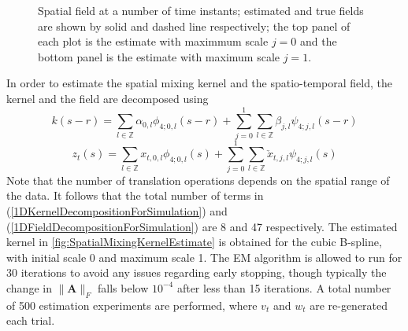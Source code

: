 \documentclass[11pt,draftcls,onecolumn,peerreview]{IEEEtran}
\begin{document}
\begin{figure}[!hb]
\caption{Spatial field at a number of time instants; estimated and true fields are shown by solid and dashed line respectively; the top panel of each plot is the estimate with maximmum scale $j=0$ and the bottom panel is the estimate with maximum scale $j=1$.}
\label{fig:1DFieldEstimation}
\end{figure}
In order to estimate the spatial mixing kernel and the spatio-temporal field, the  kernel and the field are decomposed using
\begin{equation}
 k\left(s-r\right)=\sum_{l \in \mathbb{Z}}\alpha_{0,l}\phi_{4;0,l}\left(s-r\right)+\sum_{j=0}^{1} \sum_{l \in \mathbb{Z}}\beta_{j,l}\psi_{4;j,l}\left(s-r\right)
\label{1DKernelDecompositionForSimulation}
\end{equation}
\begin{equation}
 z_t\left(s\right)=\sum_{l \in \mathbb{Z}}x_{t,0,l}\phi_{4;0,l}\left(s\right)+\sum_{j=0}^{1} \sum_{l \in \mathbb{Z}} \check{x}_{t,j,l}\psi_{4;j,l}\left(s\right)
\label{1DFieldDecompositionForSimulation}
\end{equation}
Note that the number of translation operations depends on the spatial range of the data. It follows that the total number of terms in (\ref{1DKernelDecompositionForSimulation}) and (\ref{1DFieldDecompositionForSimulation}) are 8 and 47 respectively. The estimated kernel in \figurename{\ref{fig:SpatialMixingKernelEstimate} } is obtained for the cubic B-spline, with initial scale 0 and maximum scale 1. The EM algorithm is allowed to run for 30 iterations to avoid any issues regarding early stopping, though typically the change in $\parallel \mathbf{A} \parallel_{F}$ falls below $10^{-4} $ after less than 15 iterations. A total number of 500 estimation experiments are performed, where $v_t$ and $w_t$ are re-generated each trial.
\end{document}
